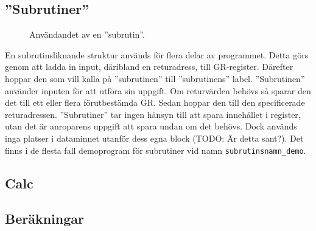 \documentclass[]{article}
\begin{document}
\subsection{''Subrutiner''}
\begin{figure}[h!]
	\caption{Användandet av en ''subrutin''. }
\end{figure}

En subrutinsliknande struktur används för flera delar av programmet. Detta görs genom att ladda in input, däribland en returadress, till GR-register. Därefter hoppar den som vill kalla på ''subrutinen'' till ''subrutinens'' label. ''Subrutinen'' använder inputen för att utföra sin uppgift. Om returvärden behövs så sparar den det till ett eller flera förutbestämda GR. Sedan hoppar den till den specificerade returadressen. ''Subrutiner'' tar ingen hänsyn till att spara innehållet i register, utan det är anroparens uppgift att spara undan om det behövs. Dock används inga platser i dataminnet utanför dess egna block (TODO: Är detta sant?). Det finns i de flesta fall demoprogram för subrutiner vid namn \texttt{subrutinsnamn\_demo}.

\subsection{Calc}

\subsection{Beräkningar}
\end{document}
